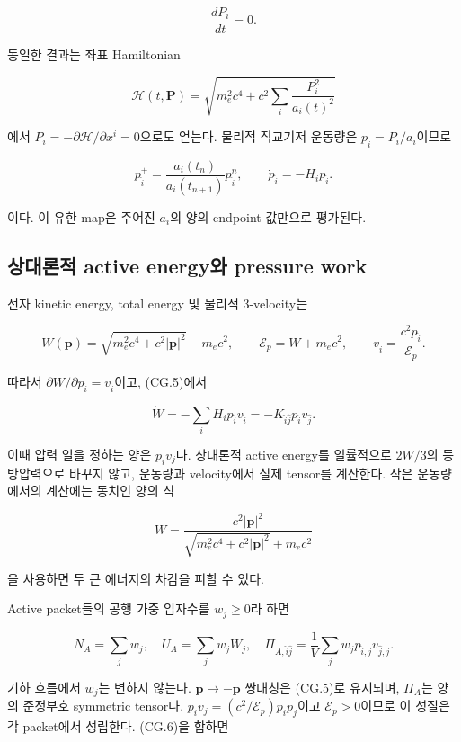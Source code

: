 \[
\frac{dP_i}{dt}=0.
\]

동일한 결과는 좌표 Hamiltonian

\[
\mathcal H(t,\boldsymbol P)
=\sqrt{m_e^2c^4+c^2\sum_i\frac{P_i^2}{a_i(t)^2}}
\]

에서 \(\dot P_i=-\partial\mathcal H/\partial x^i=0\)으로도 얻는다. 물리적 직교기저 운동량은 \(p_{\hat i}=P_i/a_i\)이므로

\[
\boxed{
p_{\hat i}^{+}
=\frac{a_i(t_n)}{a_i(t_{n+1})}p_{\hat i}^{n},
\qquad
\dot p_{\hat i}=-H_i p_{\hat i}.
}
\tag{CG.5}
\]

이다. 이 유한 map은 주어진 \(a_i\)의 양의 endpoint 값만으로 평가된다.

\hypertarget{uxc0c1uxb300uxb860uxc801-active-energyuxc640-pressure-work}{%
\subsection{상대론적 active energy와 pressure work}\label{uxc0c1uxb300uxb860uxc801-active-energyuxc640-pressure-work}}

전자 kinetic energy, total energy 및 물리적 3-velocity는

\[
W(\boldsymbol p)
=\sqrt{m_e^2c^4+c^2|\boldsymbol p|^2}-m_ec^2,\qquad
\mathcal E_p=W+m_ec^2,\qquad
v_{\hat i}=\frac{c^2p_{\hat i}}{\mathcal E_p}.
\]

따라서 \(\partial W/\partial p_{\hat i}=v_{\hat i}\)이고, (CG.5)에서

\[
\boxed{
\dot W
=-\sum_iH_i p_{\hat i}v_{\hat i}
=-K_{\hat i\hat j}p_{\hat i}v_{\hat j}.
}
\tag{CG.6}
\]

이때 압력 일을 정하는 양은 \(p_iv_j\)다. 상대론적 active energy를 일률적으로 \(2W/3\)의 등방압력으로 바꾸지 않고, 운동량과 velocity에서 실제 tensor를 계산한다. 작은 운동량에서의 계산에는 동치인 양의 식

\[
W=\frac{c^2|\boldsymbol p|^2}
{\sqrt{m_e^2c^4+c^2|\boldsymbol p|^2}+m_ec^2}
\]

을 사용하면 두 큰 에너지의 차감을 피할 수 있다.

Active packet들의 공행 가중 입자수를 \(w_j\ge0\)라 하면

\[
N_A=\sum_jw_j,\quad
U_A=\sum_jw_j W_j,\quad
\Pi_{A,\hat i\hat j}
=\frac1V\sum_jw_jp_{\hat i,j}v_{\hat j,j}.
\]

기하 흐름에서 \(w_j\)는 변하지 않는다. \(\boldsymbol p\mapsto-\boldsymbol p\) 쌍대칭은 (CG.5)로 유지되며, \(\Pi_A\)는 양의 준정부호 symmetric tensor다. \(p_i v_j=(c^2/\mathcal E_p)p_i p_j\)이고 \(\mathcal E_p>0\)이므로 이 성질은 각 packet에서 성립한다. (CG.6)을 합하면

